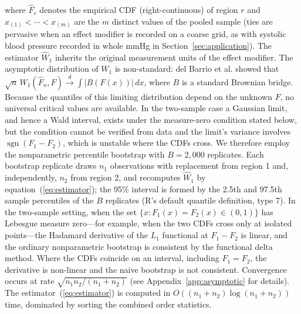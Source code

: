 \documentclass[AMA,Times1COL]{WileyNJDv5}
\begin{document}
where $\hat{F}_r$ denotes the empirical CDF (right-continuous) of region $r$ and $x_{(1)} < \cdots < x_{(m)}$ are the $m$ distinct values of the pooled sample (ties are pervasive when an effect modifier is recorded on a coarse grid, as with systolic blood pressure recorded in whole mmHg in Section~\ref{sec:application}). The estimator $\widehat{W}_1$ inherits the original measurement units of the effect modifier. The asymptotic distribution of $W_1$ is non-standard: del Barrio et al.\cite{delbarrio1999} showed that $\sqrt{n}\,W_1(\hat{F}_n, F) \xrightarrow{d} \int |B(F(x))|\,dx$, where $B$ is a standard Brownian bridge. Because the quantiles of this limiting distribution depend on the unknown $F$, no universal critical values are available. In the two-sample case a Gaussian limit, and hence a Wald interval, exists under the measure-zero condition stated below, but the condition cannot be verified from data and the limit's variance involves $\operatorname{sgn}(F_1 - F_2)$, which is unstable where the CDFs cross. We therefore employ the nonparametric percentile bootstrap with $B = 2{,}000$ replicates.\cite{efron1993} Each bootstrap replicate draws $n_1$ observations with replacement from region 1 and, independently, $n_2$ from region 2, and recomputes $\widehat{W}_1$ by equation~(\ref{eq:estimator}); the 95\% interval is formed by the 2.5th and 97.5th sample percentiles of the $B$ replicates (R's default quantile definition, type 7). In the two-sample setting, when the set $\{x : F_1(x) = F_2(x) \in (0,1)\}$ has Lebesgue measure zero---for example, when the two CDFs cross only at isolated points---the Hadamard derivative of the $L_1$ functional at $F_1 - F_2$ is linear, and the ordinary nonparametric bootstrap is consistent by the functional delta method.\cite{fang2019} Where the CDFs coincide on an interval, including $F_1 = F_2$, the derivative is non-linear and the naive bootstrap is not consistent.\cite{dumbgen1993,fang2019,sommerfeld2018} Convergence occurs at rate $\sqrt{n_1 n_2/(n_1+n_2)}$ (see Appendix~\ref{app:asymptotic} for details). The estimator~(\ref{eq:estimator}) is computed in $O((n_1 + n_2) \log(n_1 + n_2))$ time, dominated by sorting the combined order statistics.
\end{document}
